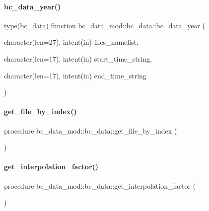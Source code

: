 \paragraph{\texorpdfstring{bc\+\_\+data\+\_\+year()}{bc\_data\_year()}}
{\footnotesize\ttfamily type(\mbox{\hyperlink{structbc__data__mod_1_1bc__data}{bc\+\_\+data}}) function bc\+\_\+data\+\_\+mod\+::bc\+\_\+data\+::bc\+\_\+data\+\_\+year (\begin{DoxyParamCaption}\item[{character(len=27), intent(in)}]{files\+\_\+namelist,  }\item[{character(len=17), intent(in)}]{start\+\_\+time\+\_\+string,  }\item[{character(len=17), intent(in)}]{end\+\_\+time\+\_\+string }\end{DoxyParamCaption})\hspace{0.3cm}{\ttfamily [private]}}

\mbox{\label{structbc__data__mod_1_1bc__data_a41f21b3b50a142b75b72783201138764}} 
\paragraph{\texorpdfstring{get\+\_\+file\+\_\+by\+\_\+index()}{get\_file\_by\_index()}}
{\footnotesize\ttfamily procedure bc\+\_\+data\+\_\+mod\+::bc\+\_\+data\+::get\+\_\+file\+\_\+by\+\_\+index (\begin{DoxyParamCaption}{ }\end{DoxyParamCaption})\hspace{0.3cm}{\ttfamily [private]}}

\mbox{\label{structbc__data__mod_1_1bc__data_a349ac8feea73d8b81f701430b13da35e}} 
\paragraph{\texorpdfstring{get\+\_\+interpolation\+\_\+factor()}{get\_interpolation\_factor()}}
{\footnotesize\ttfamily procedure bc\+\_\+data\+\_\+mod\+::bc\+\_\+data\+::get\+\_\+interpolation\+\_\+factor (\begin{DoxyParamCaption}{ }\end{DoxyParamCaption})\hspace{0.3cm}{\ttfamily [private]}}


